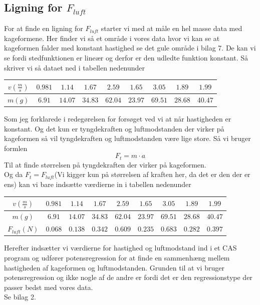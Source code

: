 \documentclass[12pt]{article}
\begin{document}
\subsection{Ligning for $F_{luft}$}
For at finde en ligning for $F_{luft}$ starter vi med at måle en hel masse data
med kageformene. Her finder vi så et område i vores data hvor vi kan se at kageformen
falder med konstant hastighed se det gule område i bilag 7. De kan vi se fordi stedfunktionen er lineær og derfor er
den udledte funktion konstant. Så skriver vi så dataet ned i tabellen nedenunder
\begin{center}
  \begin{tabular}{| c | c | c | c | c | c | c | c | c |}
        \hline
        $v(\frac{m}{s})$ & $0.981$ & $1.14$ & $1.67$ & $2.59$ & $1.65$ & $3.05$ & $1.89$ & $1.99$ \\
        \hline
        $m(g)$ & $6.91$ & $14.07$ & $34.83$ & $62.04$ & $23.97$ & $69.51$ & $28.68$ & $40.47$ \\
        \hline
  \end{tabular}
\end{center}

Som jeg forklarede i redegørelsen for forsøget ved vi at når hastigheden er konstant. Og det kun er tyngdekraften og luftmodstanden der virker på kageformen
så vil tyngdekraften og luftmodstanden være lige store. Så vi bruger formlen
$$F_{t}=m \cdot a$$
Til at finde størrelsen på tyngdekraften der virker på kageformen. \\
Og da $F_{t}=F_{luft}$(Vi kigger kun på størrelsen af kraften her, da det er den der er ens)
kan vi bare indsætte værdierne in i tabellen nedenunder
\begin{center}
  \begin{tabular}{| c | c | c | c | c | c | c | c | c |}
        \hline
        $v(\frac{m}{s})$ & $0.981$ & $1.14$ & $1.67$ & $2.59$ & $1.65$ & $3.05$ & $1.89$ & $1.99$ \\
        \hline
        $m(g)$ & $6.91$ & $14.07$ & $34.83$ & $62.04$ & $23.97$ & $69.51$ & $28.68$ & $40.47$ \\
        \hline
        $F_{luft}(N)$ & $0.068$ & $0.138$ & $0.342$ & $0.609$ & $0.235$ & $0.683$ & $0.282$ & $0.397$ \\
        \hline
  \end{tabular}
\end{center}

Herefter indsætter vi værdierne for hastighed og luftmodstand ind i et CAS program og udfører potensregression for at finde en sammenhæng mellem
hastigheden af kageformen og luftmodstanden. Grunden til at vi bruger potensregression og ikke nogle af de andre er fordi det er den regressionstype der passer bedst med vores data.\\
Se bilag 2.
\end{document}
